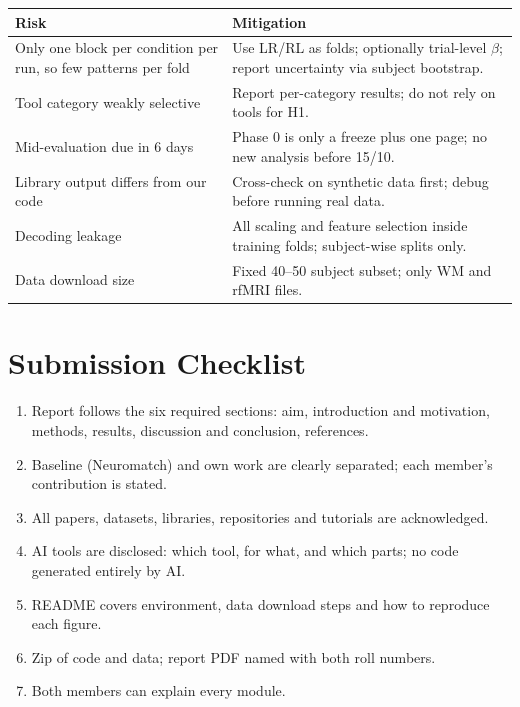 \documentclass[11pt,a4paper]{article}
\begin{document}
\begin{xltabular}{\linewidth}{@{}p{5cm}Y@{}}
\toprule
\textbf{Risk} & \textbf{Mitigation}\\
\midrule
\endhead
Only one block per condition per run, so few patterns per fold & Use LR/RL as folds; optionally trial-level $\beta$; report uncertainty via subject bootstrap.\\
Tool category weakly selective & Report per-category results; do not rely on tools for H1.\\
Mid-evaluation due in 6 days & Phase 0 is only a freeze plus one page; no new analysis before 15/10.\\
Library output differs from our code & Cross-check on synthetic data first; debug before running real data.\\
Decoding leakage & All scaling and feature selection inside training folds; subject-wise splits only.\\
Data download size & Fixed 40--50 subject subset; only WM and rfMRI files.\\
\bottomrule
\end{xltabular}

\section{Submission Checklist}
\begin{enumerate}
\item Report follows the six required sections: aim, introduction and motivation, methods, results, discussion and conclusion, references.
\item Baseline (Neuromatch) and own work are clearly separated; each member's contribution is stated.
\item All papers, datasets, libraries, repositories and tutorials are acknowledged.
\item AI tools are disclosed: which tool, for what, and which parts; no code generated entirely by AI.
\item README covers environment, data download steps and how to reproduce each figure.
\item Zip of code and data; report PDF named with both roll numbers.
\item Both members can explain every module.
\end{enumerate}
\end{document}
